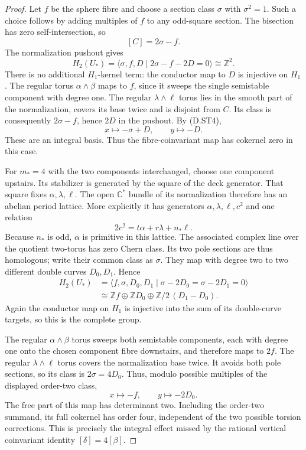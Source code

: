 \begin{proof}
Let $f$ be the sphere fibre and choose a section class $\sigma$
with $\sigma^2=1$. Such a choice follows by adding multiples of
$f$ to any odd-square section. The bisection has zero
self-intersection, so
\[
 [C]=2\sigma-f.
\]
The normalization pushout gives
\[
 H_2(U_*)=
 \langle\sigma,f,D\mid 2\sigma-f-2D=0\rangle
          \cong\mathbb Z^2.                               \tag{D.ST6}
\]
There is no additional $H_1$-kernel term: the conductor map to
$D$ is injective on $H_1$. The regular torus
$\alpha\wedge\beta$ maps to $f$, since it sweeps the single
semistable component with degree one. The regular
$\lambda\wedge\ell$ torus lies in the smooth part of the
normalization, covers its base twice and is disjoint from $C$.
Its class is consequently $2\sigma-f$, hence $2D$ in the
pushout. By (D.ST4),
\[
 x\longmapsto-\sigma+D,\qquad y\longmapsto-D.
\]
These are an integral basis. Thus the fibre-coinvariant map has
cokernel zero in this case.

For $m_*=4$ with the two components interchanged, choose one
component upstairs. Its stabilizer is generated by the square
of the deck generator. That square fixes
$\alpha,\lambda,\ell$. The open $\mathbb C^*$ bundle of its
normalization therefore has an abelian period lattice. More
explicitly it has generators $\alpha,\lambda,\ell,c^2$ and one
relation
\[
 2c^2=t\alpha+r\lambda+n_*\ell.
\]
Because $n_*$ is odd, $\alpha$ is primitive in this lattice.
The associated complex line over the quotient two-torus has
zero Chern class. Its two pole sections are thus homologous;
write their common class as $\sigma$. They map with degree two
to two different double curves $D_0,D_1$. Hence
\[
\begin{split}
 H_2(U_*)&=
 \langle f,\sigma,D_0,D_1\mid
                  \sigma-2D_0=\sigma-2D_1=0\rangle\\
 &\cong\mathbb Z f\oplus\mathbb Z D_0
                       \oplus\mathbb Z/2\,(D_1-D_0).
\end{split}                                                 \tag{D.ST7}
\]
Again the conductor map on $H_1$ is injective into the sum of
its double-curve targets, so this is the complete group.

The regular $\alpha\wedge\beta$ torus sweeps both semistable
components, each with degree one onto the chosen component
fibre downstairs, and therefore maps to $2f$. The regular
$\lambda\wedge\ell$ torus covers the normalization base twice.
It avoids both pole sections, so its class is $2\sigma=4D_0$.
Thus, modulo possible multiples of the displayed order-two
class,
\[
 x\longmapsto-f,\qquad y\longmapsto-2D_0.
\]
The free part of this map has determinant two. Including the
order-two summand, its full cokernel has order four, independent
of the two possible torsion corrections. This is precisely the
integral effect missed by the rational vertical coinvariant
identity $[\delta]=4[\beta]$.


\end{proof}
